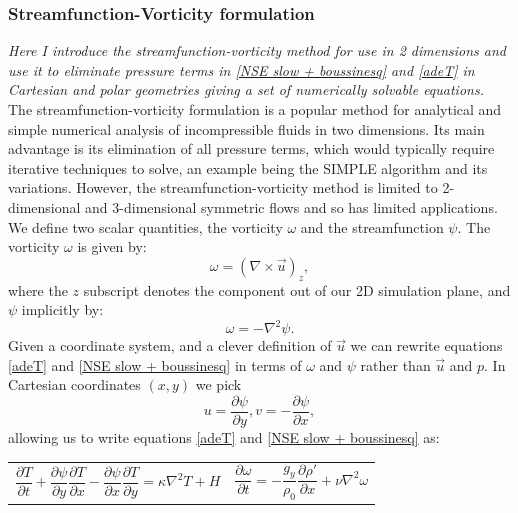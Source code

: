 \documentclass{article}
\begin{document}
\subsubsection*{Streamfunction-Vorticity formulation}
{\it{Here I introduce the streamfunction-vorticity method for use in 2 dimensions and use it to eliminate pressure terms in \ref{NSE slow + boussinesq} and \ref{adeT} in Cartesian and polar geometries giving a set of numerically solvable equations.}}
\vspace{0.3cm}
\newline
\noindent The streamfunction-vorticity formulation is a popular method for analytical and simple numerical analysis of incompressible fluids in two dimensions. Its main advantage is its elimination of all pressure terms, which would typically require iterative techniques to solve, an example being the SIMPLE algorithm and its variations. However, the streamfunction-vorticity method is limited to 2-dimensional and 3-dimensional symmetric flows and so has limited applications.
\newline
\noindent We define two scalar quantities, the vorticity $\omega$ and the streamfunction $\psi$. The vorticity $\omega$ is given by:
\begin{equation}
	\omega = (\nabla \times \vec{u})_z,
	\label{omega}
\end{equation}
where the $z$ subscript denotes the component out of our 2D simulation plane, and $\psi$ implicitly by:
\begin{equation}
	\omega = - \nabla^2 \psi.
	\label{psi}
\end{equation}
Given a coordinate system, and a clever definition of $\vec{u}$ we can rewrite equations \ref{adeT} and \ref{NSE slow + boussinesq} in terms of $\omega$ and $\psi$ rather than $\vec{u}$ and $p$. In Cartesian coordinates $(x,y)$ we pick 
\begin{equation}
	u = \frac{\partial \psi}{\partial y}, v = -\frac{\partial \psi}{\partial x},
	\label{cartesian velocities}
\end{equation}
allowing us to write equations \ref{adeT} and \ref{NSE slow + boussinesq} as:
\begin{tabularx}{\textwidth}{XX}
\begin{equation}
	\frac{\partial T}{\partial t} + \frac{\partial \psi}{\partial y} \frac{\partial T}{\partial x} - \frac{\partial \psi}{\partial x} \frac{\partial T}{\partial y} = \kappa \nabla^2 T + H
	\label{adeT sfvt cartesian}
\end{equation}
    &
\begin{equation}
	\frac{\partial \omega}{\partial t} = -\frac{g_y}{\rho_0} \frac{\partial \rho'}{\partial x} + \nu \nabla^2 \omega
	\label{NSE slow + boussinesq sfvt cartesian}
\end{equation}
\end{tabularx}\par
\end{document}
